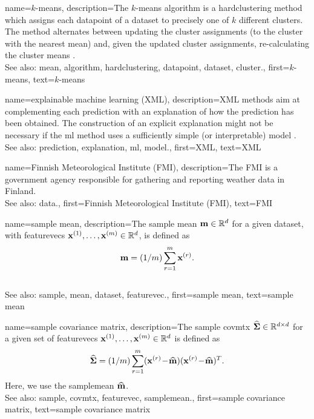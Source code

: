 	
{name={$k$-means}, 
	description={The $k$-\glspl{mean} \gls{algorithm} 
		is a \gls{hardclustering} method which assigns each \gls{datapoint} of a \gls{dataset} 
		to precisely one of $k$ different \glspl{cluster}. The method alternates between updating 
		the \gls{cluster} assignments (to the \gls{cluster} with the nearest \gls{mean}) and, given the 
		updated \gls{cluster} assignments, re-calculating the \gls{cluster} \glspl{mean} \cite[Ch. 8]{MLBasics}.
				\\
		See also: \gls{mean}, \gls{algorithm}, \gls{hardclustering}, \gls{datapoint}, \gls{dataset}, \gls{cluster}.},
	first={$k$-means},
	text={$k$-means} 
}


{name={explainable machine learning (XML)}, 
	description={XML 
		methods aim at complementing each \gls{prediction} with an \gls{explanation} of 
		how the \gls{prediction} has been obtained. The construction of an explicit \gls{explanation} 
		might not be necessary if the \gls{ml} method uses a sufficiently simple (or interpretable) \gls{model} \cite{rudin2019stop}.
				\\
		See also: \gls{prediction}, \gls{explanation}, \gls{ml}, \gls{model}.},
	first={XML},
	text={XML} 
}

{name={Finnish Meteorological Institute (FMI)}, 
	description={The
		FMI is a government agency responsible for gathering 
		and reporting weather \gls{data} in Finland.
				\\
		See also: \gls{data}.},
	first={Finnish Meteorological Institute (FMI)},
	text={FMI} 
}
	
	
{name={sample mean}, 
	description={The \gls{sample} \gls{mean} 
		${\bf m} \in \mathbb{R}^{d}$ for a given \gls{dataset}, with \glspl{featurevec} ${\bf x}^{(1)},\ldots,{\bf x}^{(m)} \in \mathbb{R}^{d}$, 
		is defined as 
		$${\bf m} = (1/m) \sum_{r=1}^{m} {\bf x}^{(r)}.$$ 
					\\
		See also: \gls{sample}, \gls{mean}, \gls{dataset}, \gls{featurevec}.},
	first={sample mean},
	text={sample mean} 
}

	
{name={sample covariance matrix}, 
	description={The 
		\gls{sample} \gls{covmtx} $\widehat{\bf \Sigma} \in \mathbb{R}^{d \times d}$ 
		for a given set of \glspl{featurevec} ${\bf x}^{(1)},\ldots,{\bf x}^{(m)} \in \mathbb{R}^{d}$ is defined as 
		$$\widehat{\bf \Sigma} = (1/m) \sum_{r=1}^{m} ({\bf x}^{(r)}\!-\!\widehat{{\bf m}}) ({\bf x}^{(r)}\!-\!\widehat{{\bf m}})^{T}.$$ 
		Here, we use the \gls{samplemean} $\widehat{{\bf m}}$. 
				\\
		See also: \gls{sample}, \gls{covmtx}, \gls{featurevec}, \gls{samplemean}.},
	first={sample covariance matrix},
	text={sample covariance matrix} 
}


